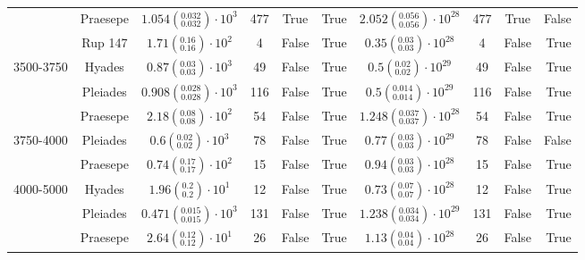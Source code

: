 \begin{tabular}{lccccccccr}
          & Praesepe &  $1.054\left(^{0.032}_{0.032}\right)\cdot 10^{3}$ &            477 &            True &            True &  $2.052\left(^{0.056}_{0.056}\right)\cdot 10^{28}$ &              477 &              True &             False \\
          & Rup 147 &     $1.71\left(^{0.16}_{0.16}\right)\cdot 10^{2}$ &              4 &           False &            True &     $0.35\left(^{0.03}_{0.03}\right)\cdot 10^{28}$ &                4 &             False &              True \\
3500-3750 & Hyades &     $0.87\left(^{0.03}_{0.03}\right)\cdot 10^{3}$ &             49 &           False &            True &      $0.5\left(^{0.02}_{0.02}\right)\cdot 10^{29}$ &               49 &             False &              True \\
          & Pleiades &  $0.908\left(^{0.028}_{0.028}\right)\cdot 10^{3}$ &            116 &           False &            True &    $0.5\left(^{0.014}_{0.014}\right)\cdot 10^{29}$ &              116 &             False &              True \\
          & Praesepe &     $2.18\left(^{0.08}_{0.08}\right)\cdot 10^{2}$ &             54 &           False &            True &  $1.248\left(^{0.037}_{0.037}\right)\cdot 10^{28}$ &               54 &             False &              True \\
3750-4000 & Pleiades &      $0.6\left(^{0.02}_{0.02}\right)\cdot 10^{3}$ &             78 &           False &            True &     $0.77\left(^{0.03}_{0.03}\right)\cdot 10^{29}$ &               78 &             False &             False \\
          & Praesepe &     $0.74\left(^{0.17}_{0.17}\right)\cdot 10^{2}$ &             15 &           False &            True &     $0.94\left(^{0.03}_{0.03}\right)\cdot 10^{28}$ &               15 &             False &              True \\
4000-5000 & Hyades &       $1.96\left(^{0.2}_{0.2}\right)\cdot 10^{1}$ &             12 &           False &            True &     $0.73\left(^{0.07}_{0.07}\right)\cdot 10^{28}$ &               12 &             False &              True \\
          & Pleiades &  $0.471\left(^{0.015}_{0.015}\right)\cdot 10^{3}$ &            131 &           False &            True &  $1.238\left(^{0.034}_{0.034}\right)\cdot 10^{29}$ &              131 &             False &              True \\
          & Praesepe &     $2.64\left(^{0.12}_{0.12}\right)\cdot 10^{1}$ &             26 &           False &            True &     $1.13\left(^{0.04}_{0.04}\right)\cdot 10^{28}$ &               26 &             False &              True \\

\end{tabular}

